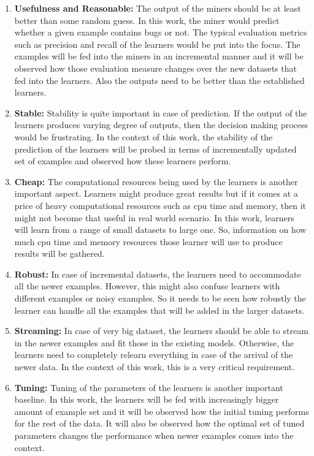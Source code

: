 \documentclass[sigplan]{acmart}\settopmatter{printfolios=true,printccs=false,printacmref=false}
\begin{document}
\begin{enumerate}
	\item \textbf{Usefulness and Reasonable: } The output of the miners should be at least better than some random guess. In this work, the miner would predict whether a given example contains bugs or not. The typical evaluation metrics such as precision and recall of the learners would be put into the focus. The examples will be fed into the miners in an incremental manner and it will be observed how those evaluation measure changes over the new datasets that fed into the learners. Also the outputs need to be better than the established learners.
	\item \textbf{Stable: } Stability is quite important in case of prediction. If the output of the learners produces varying degree of outputs, then the decision making process would be frustrating. In the context of this work, the stability of the prediction of the learners will be probed in terms of incrementally updated set of examples and observed how these learners perform.
	\item \textbf{Cheap: } The computational resources being used by the learners is another important aspect. Learners might produce great results but if it comes at a price of heavy computational resources such as cpu time and memory, then it might not become that useful in real world scenario. In this work, learners will learn from a range of small datasets to large one. So, information on how much cpu time and memory resources those learner will use to produce results will be gathered.
	\item \textbf{Robust: } In case of incremental datasets, the learners need to accommodate all the newer examples. However, this might also confuse learners with different examples or noisy examples. So it needs to be seen how robustly the learner can handle all the examples that will be added in the larger datasets.
	\item \textbf{Streaming: } In case of very big dataset, the learners should be able to stream in the newer examples and fit those in the existing models. Otherwise, the learners need to completely relearn everything in case of the arrival of the newer data. In the context of this work, this is a very critical requirement.
	\item \textbf{Tuning: } Tuning of the parameters of the learners is another important baseline. In this work, the learners will be fed with increasingly bigger amount of example set and it will be observed how the initial tuning performs for the rest of the data. It will also be observed how the optimal set of tuned parameters changes the performance when newer examples comes into the context.
\end{enumerate}
\end{document}
